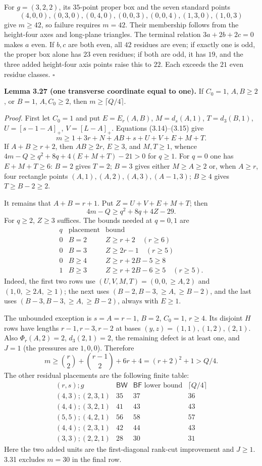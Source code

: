 \documentclass[11pt]{article}
\begin{document}
For $g=(3,2,2)$, its $35$-point proper box and the seven standard points
\[
(4,0,0),(0,3,0),(0,4,0),(0,0,3),(0,0,4),(1,3,0),(1,0,3)
\]
give $m\ge42$, so failure requires $m=42$.  Their membership follows
from the height-four axes and long-plane triangles.  The terminal
relation $3a+2b+2c=0$ makes $a$ even.  If $b,c$ are both even, all
$42$ residues are even; if exactly one is odd, the proper box alone has
$23$ even residues; if both are odd, it has $19$, and the three added
height-four axis points raise this to $22$.  Each exceeds the $21$
even residue classes. \ensuremath{\square}

\label{res:A3.4}
\textbf{Lemma 3.27 (one transverse coordinate equal to one).}
If $C_0=1$, $A,B\ge2$, or $B=1$, $A,C_0\ge2$, then
$m\ge\lceil Q/4\rceil$.

\emph{Proof.}
First let $C_0=1$ and put
$E=E_r(A,B)$, $M=d_s(A,1)$, $T=d_3(B,1)$,
$U=[s-1-A]_+$, $V=[L-A]_+$.  Equations (3.14)--(3.15) give
\[
 m\ge1+3r+N+AB+s+U+V+E+M+T.\tag{3.18}
\]
If $A+B\ge r+2$, then $AB\ge2r$, $E\ge3$, and $M,T\ge1$, whence
$4m-Q\ge q^2+8q+4(E+M+T)-21>0$ for $q\ge1$.
For $q=0$ one has $E+M+T\ge6$: $B=2$ gives $T=2$;
$B=3$ gives either $M\ge A\ge2$ or, when $A\ge r$, four rectangle
points $(A,1),(A,2),(A,3),(A-1,3)$; $B\ge4$ gives $T\ge B-2\ge2$.

It remains that $A+B=r+1$.  Put $Z=U+V+E+M+T$; then
\[
 4m-Q\ge q^2+8q+4Z-29.\tag{3.19}
\]
For $q\ge2$, $Z\ge3$ suffices.  The bounds needed at $q=0,1$ are
\[
\begin{array}{c|c|c}
q&\text{placement}&\text{bound}\\\hline
0&B=2&Z\ge r+2\quad(r\ge6)\\
0&B=3&Z\ge2r-1\quad(r\ge5)\\
0&B\ge4&Z\ge r+2B-5\ge8\\
1&B\ge3&Z\ge r+2B-6\ge5\quad(r\ge5).
\end{array}
\]
Indeed, the first two rows use $(U,V,M,T)=(0,0,\ge A,2)$ and
$(1,0,\ge2A,\ge1)$; the next uses
$(B-2,B-3,\ge A,\ge B-2)$, and the last uses
$(B-3,B-3,\ge A,\ge B-2)$, always with $E\ge1$.

The unbounded exception is $s=A=r-1$, $B=2$, $C_0=1$, $r\ge4$.
Its disjoint $H$ rows have lengths $r-1,r-3,r-2$ at bases
$(y,z)=(1,1),(1,2),(2,1)$.  Also $\Phi_r(A,2)=2$,
$d_3(2,1)=2$, the remaining defect is at least one, and $J=1$
(the pressures are $1,0,0$).  Therefore
\[
 m\ge\binom r2+\binom{r-1}2+6r+4=(r+2)^2+1>Q/4.
\]
The other residual placements are the following finite table:
\[
\begin{array}{c|r|r|r}
(r,s);g&\mathsf{BW}&\mathsf{BF}\text{ lower bound}&\lceil Q/4\rceil\\\hline
(4,3);(2,3,1)&35&37&36\\
(4,4);(3,2,1)&41&43&43\\
(5,5);(4,2,1)&56&58&57\\
(4,4);(2,3,1)&42&44&43\\
(3,3);(2,2,1)&28&30&31
\end{array}
\]
Here the two added units are the first-diagonal rank-cut improvement
and $J\ge1$.  3.31 excludes $m=30$ in the final row.
\end{document}

